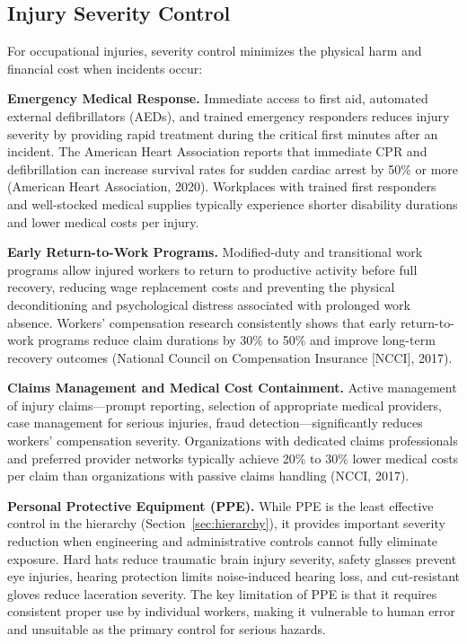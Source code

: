\documentclass[11pt,openany]{book}
\begin{document}
\subsection{Injury Severity Control}

For occupational injuries, severity control minimizes the physical harm and
financial cost when incidents occur:

\textbf{Emergency Medical Response.} Immediate access to first aid, automated
external defibrillators (AEDs), and trained emergency responders reduces
injury severity by providing rapid treatment during the critical first minutes
after an incident. The American Heart Association reports that immediate CPR
and defibrillation can increase survival rates for sudden cardiac arrest by
50\% or more (American Heart Association, 2020). Workplaces with trained first
responders and well-stocked medical supplies typically experience shorter
disability durations and lower medical costs per injury.

\textbf{Early Return-to-Work Programs.} Modified-duty and transitional work
programs allow injured workers to return to productive activity before full
recovery, reducing wage replacement costs and preventing the physical
deconditioning and psychological distress associated with prolonged work
absence. Workers' compensation research consistently shows that early
return-to-work programs reduce claim durations by 30\% to 50\% and improve
long-term recovery outcomes (National Council on Compensation Insurance
[NCCI], 2017).

\textbf{Claims Management and Medical Cost Containment.} Active management of
injury claims---prompt reporting, selection of appropriate medical providers,
case management for serious injuries, fraud detection---significantly reduces
workers' compensation severity. Organizations with dedicated claims
professionals and preferred provider networks typically achieve 20\% to 30\%
lower medical costs per claim than organizations with passive claims handling
(NCCI, 2017).

\textbf{Personal Protective Equipment (PPE).} While PPE is the least effective
control in the hierarchy (Section~\ref{sec:hierarchy}), it provides important
severity reduction when engineering and administrative controls cannot fully
eliminate exposure. Hard hats reduce traumatic brain injury severity, safety
glasses prevent eye injuries, hearing protection limits noise-induced hearing
loss, and cut-resistant gloves reduce laceration severity. The key limitation
of PPE is that it requires consistent proper use by individual workers, making
it vulnerable to human error and unsuitable as the primary control for serious
hazards.
\end{document}
